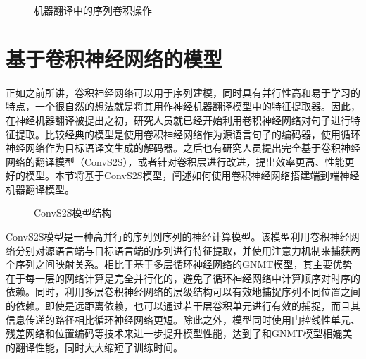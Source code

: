 \begin{figure}[htp]
\centering
%

\caption{机器翻译中的序列卷积操作}
\label{fig:11-11}
\end{figure}

\sectionnewpage
\section{基于卷积神经网络的模型}

\parinterval 正如之前所讲，卷积神经网络可以用于序列建模，同时具有并行性高和易于学习的特点，一个很自然的想法就是将其用作神经机器翻译模型中的特征提取器。因此，在神经机器翻译被提出之初，研究人员就已经开始利用卷积神经网络对句子进行特征提取。比较经典的模型是使用卷积神经网络作为源语言句子的编码器，使用循环神经网络作为目标语译文生成的解码器。之后也有研究人员提出完全基于卷积神经网络的翻译模型（ConvS2S），或者针对卷积层进行改进，提出效率更高、性能更好的模型。本节将基于ConvS2S模型，阐述如何使用卷积神经网络搭建端到端神经机器翻译模型。

\begin{figure}[htp]
\centering

\caption{ConvS2S模型结构}
\label{fig:11-12}
\end{figure}

\parinterval ConvS2S模型是一种高并行的序列到序列的神经计算模型。该模型利用卷积神经网络分别对源语言端与目标语言端的序列进行特征提取，并使用注意力机制来捕获两个序列之间映射关系。相比于基于多层循环神经网络的GNMT模型，其主要优势在于每一层的网络计算是完全并行化的，避免了循环神经网络中计算顺序对时序的依赖。同时，利用多层卷积神经网络的层级结构可以有效地捕捉序列不同位置之间的依赖。即使是远距离依赖，也可以通过若干层卷积单元进行有效的捕捉，而且其信息传递的路径相比循环神经网络更短。除此之外，模型同时使用门控线性单元、残差网络和位置编码等技术来进一步提升模型性能，达到了和GNMT模型相媲美的翻译性能，同时大大缩短了训练时间。


